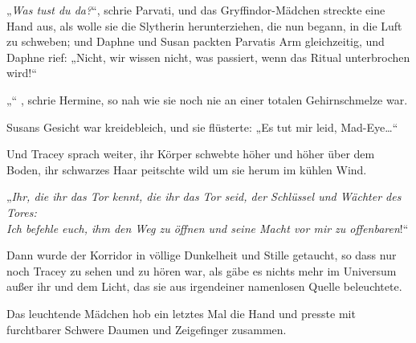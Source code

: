 „\emph{Was tust du da?}“, schrie Parvati, und das Gryffindor-Mädchen streckte eine Hand aus, als wolle sie die Slytherin herunterziehen, die nun begann, in die Luft zu schweben; und Daphne und Susan packten Parvatis Arm gleichzeitig, und Daphne rief: „Nicht, wir wissen nicht, was passiert, wenn das Ritual unterbrochen wird!“

„“ , schrie Hermine, so nah wie sie noch nie an einer totalen Gehirnschmelze war.

Susans Gesicht war kreidebleich, und sie flüsterte: „Es tut mir leid, Mad-Eye…“

Und Tracey sprach weiter, ihr Körper schwebte höher und höher über dem Boden, ihr schwarzes Haar peitschte wild um sie herum im kühlen Wind.

„\emph{Ihr, die ihr das Tor kennt, die ihr das Tor seid, der Schlüssel und Wächter des Tores:\\
Ich befehle euch, ihm den Weg zu öffnen und seine Macht vor mir zu offenbaren}!“

Dann wurde der Korridor in völlige Dunkelheit und Stille getaucht, so dass nur noch Tracey zu sehen und zu hören war, als gäbe es nichts mehr im Universum außer ihr und dem Licht, das sie aus irgendeiner namenlosen Quelle beleuchtete.

Das leuchtende Mädchen hob ein letztes Mal die Hand und presste mit furchtbarer Schwere Daumen und Zeigefinger zusammen.

